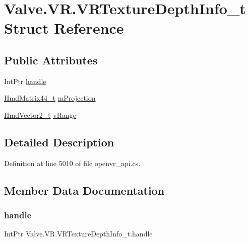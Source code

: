 \hypertarget{struct_valve_1_1_v_r_1_1_v_r_texture_depth_info__t}{}\section{Valve.\+V\+R.\+V\+R\+Texture\+Depth\+Info\+\_\+t Struct Reference}
\label{struct_valve_1_1_v_r_1_1_v_r_texture_depth_info__t}
\subsection*{Public Attributes}
\begin{DoxyCompactItemize}
\item 
Int\+Ptr \mbox{\hyperlink{struct_valve_1_1_v_r_1_1_v_r_texture_depth_info__t_a9e262bafbabae7e5497b82abbce827b2}{handle}}
\item 
\mbox{\hyperlink{struct_valve_1_1_v_r_1_1_hmd_matrix44__t}{Hmd\+Matrix44\+\_\+t}} \mbox{\hyperlink{struct_valve_1_1_v_r_1_1_v_r_texture_depth_info__t_a384611be9820716fee5ed9ac8aeacf96}{m\+Projection}}
\item 
\mbox{\hyperlink{struct_valve_1_1_v_r_1_1_hmd_vector2__t}{Hmd\+Vector2\+\_\+t}} \mbox{\hyperlink{struct_valve_1_1_v_r_1_1_v_r_texture_depth_info__t_a8072db262e6cb1b789506a5f8b05970b}{v\+Range}}
\end{DoxyCompactItemize}


\subsection{Detailed Description}


Definition at line 5010 of file openvr\+\_\+api.\+cs.



\subsection{Member Data Documentation}
\mbox{\label{struct_valve_1_1_v_r_1_1_v_r_texture_depth_info__t_a9e262bafbabae7e5497b82abbce827b2}} 
\subsubsection{\texorpdfstring{handle}{handle}}
{\footnotesize\ttfamily Int\+Ptr Valve.\+V\+R.\+V\+R\+Texture\+Depth\+Info\+\_\+t.\+handle}



